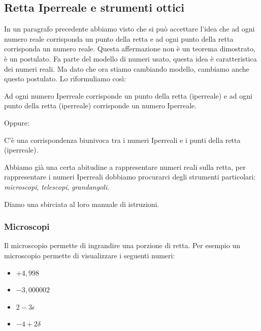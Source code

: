 

\subsection{Retta Iperreale e strumenti ottici}
\label{subsec:insnum_retta}

In un paragrafo precedente abbiamo visto che si può accettare l'idea che 
ad ogni numero reale corrisponda un punto della retta e ad ogni 
punto della retta corrisponda un numero reale. 
Questa affermazione non è un teorema dimostrato, è un postulato. 
Fa parte del modello di numeri usato, questa idea è caratteristica dei 
numeri reali. 
Ma dato che ora stiamo cambiando modello, cambiamo anche questo postulato. 
Lo riformuliamo così:

\begin{postulato}
Ad ogni numero Iperreale corrisponde un punto della retta (iperreale) e ad 
ogni punto della retta (iperreale) corrisponde un numero Iperreale.
\end{postulato}

Oppure:

\begin{postulato}
C'è una corrispondenza biunivoca tra i numeri Iperreali e 
i punti della retta (iperreale).
\end{postulato}

Abbiamo già una certa abitudine a rappresentare numeri reali sulla retta, 
per rappresentare i numeri Iperreali dobbiamo procurarci degli strumenti 
particolari: \emph{microscopi}, \emph{telescopi}, \emph{grandangoli}.

Diamo una sbirciata al loro manuale di istruzioni.

\subsubsection{Microscopi}
\label{subsec:insnum_microscopio}

Il microscopio permette di ingrandire una porzione di retta. 
Per esempio un microscopio permette di visualizzare i seguenti numeri:

\begin{multicols}{4}
\begin{itemize}[nosep]
 \item $+4,998$
 \item $-3,000002$
 \item $2-3\epsilon$
 \item $-4+2\delta$
\end{itemize}
\end{multicols}

